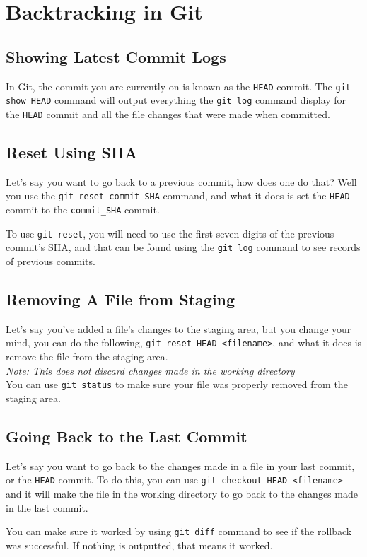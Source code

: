 \chapter{Backtracking in Git}
\section{Showing Latest Commit Logs}

In Git, the commit you are currently on is known as the \verb!HEAD! commit. The \verb!git show HEAD! command 
will output everything the \verb!git log! command display for the \verb!HEAD! commit and all the file changes that were made when committed. 

\section{Reset Using SHA}

Let's say you want to go back to a previous commit, how does one do that? Well you use the
\verb!git reset commit_SHA! command, and what it does is set the \verb!HEAD! commit to the \verb!commit_SHA! commit. 

To use \verb!git reset!, you will need to use the first seven digits of the previous commit's SHA, and 
that can be found using the \verb!git log! command to see records of previous commits.

\section{Removing A File from Staging}

Let's say you've added a file's changes to the staging area, but you change your mind, you can do the following, 
\verb!git reset HEAD <filename>!, and what it does is remove the file from the staging area.
\\
\textit{Note: This does not discard changes made in the working directory}
\\
You can use \verb!git status! to make sure your file was properly removed from the staging area. 

\section{Going Back to the Last Commit}
Let's say you want to go back to the changes made in a file in your last commit, or the \verb!HEAD! commit. 
To do this, you can use \verb!git checkout HEAD <filename>! and it will make the file in the working directory to go back to the changes made in the last commit.

You can make sure it worked by using \verb!git diff! command to see if the rollback was successful. If nothing is outputted, that means it worked. 
\newpage